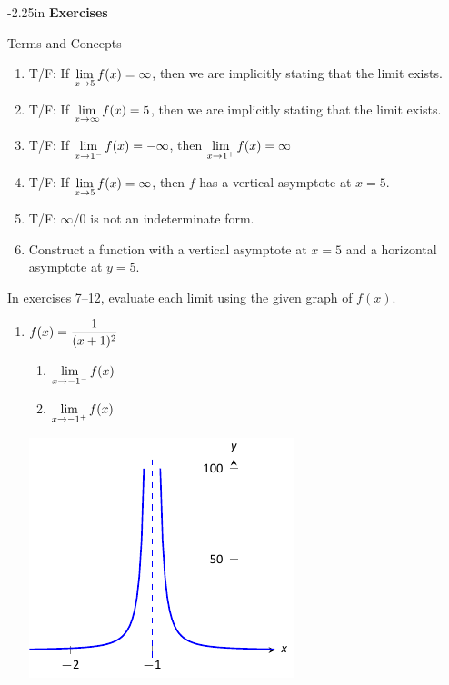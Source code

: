 \begin{adjustwidth*}{}{-2.25in}
\textbf{{\large Exercises}}
\setlength{\columnsep}{25pt}
\begin{multicols*}{2}
\noindent Terms and Concepts \small

\begin{enumerate}[1)]
\item {T/F: If $\displaystyle \lim_{x\to 5} f(x) = \infty$, then we are implicitly stating that the limit exists.}
\item {T/F: If $\displaystyle \lim_{x\to \infty} f(x) = 5$, then we are implicitly stating that the limit exists.}
\item {T/F: If $\displaystyle \lim_{x\to 1^-} f(x) = -\infty$, then $\displaystyle \lim_{x\to 1^+} f(x) = \infty$}
\item {T/F: If $\displaystyle \lim_{x\to 5} f(x) = \infty$, then $f$ has a vertical asymptote at $x=5$.}
\item {T/F: $\infty/0$ is not an indeterminate form.}
\item {Construct a function with a vertical asymptote at $x=5$ and a horizontal asymptote at $y=5$.}
\end{enumerate} 

 \small

\noindent In exercises 7--12, evaluate each limit using the given graph of $f(x)$.

\begin{enumerate}[1),resume]
\item 
{$\displaystyle f(x) = \frac{1}{(x+1)^2}$
\begin{enumerate}
\item		$\displaystyle \lim_{x\to -1^-} f(x)$
\item		$\displaystyle \lim_{x\to -1^+} f(x)$
\end{enumerate}

\includegraphics[scale=.8]{figures/fig01_06_ex_09}
}


\end{enumerate}
\end{multicols*}
\end{adjustwidth*}
